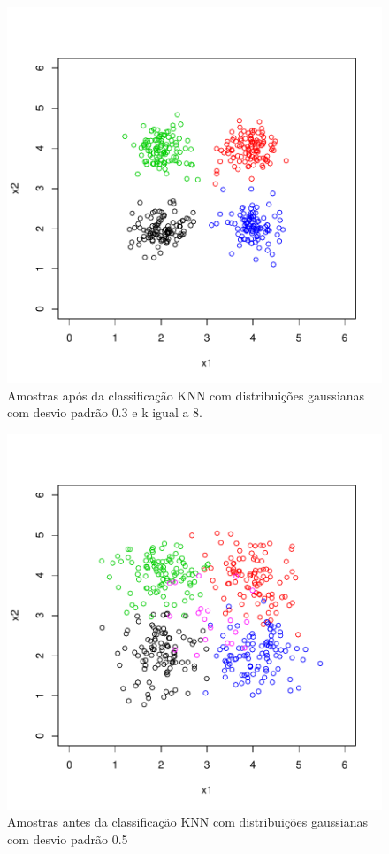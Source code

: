 \documentclass[12pt]{article}
\begin{document}
\begin{figure}[h]
\centering
\includegraphics{knn-009}
\caption{Amostras após da classificação KNN com distribuições gaussianas com desvio padrão 0.3 e k igual a 8.}
\label{sd_0.3}
\end{figure}




\begin{figure}[h]
\centering
\includegraphics{knn-011}
\caption{Amostras antes da classificação KNN com distribuições gaussianas com desvio padrão 0.5}
\label{sd_0.5}
\end{figure}
\end{document}
